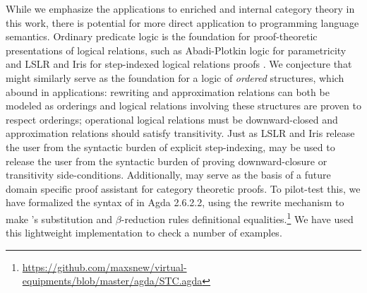 \documentclass{llncs}
\begin{document}

While we emphasize the applications to enriched and internal category
theory in this work, there is potential for more direct application to
programming language semantics.
%
Ordinary predicate logic is the foundation for proof-theoretic presentations of
logical relations, such as Abadi-Plotkin logic for parametricity and
LSLR and Iris for step-indexed logical relations proofs
\cite{abadi-plotkin,lslr,iris}.
%
We conjecture that \vett{} might similarly serve as the foundation for
a logic of \emph{ordered} structures, which abound in applications:
rewriting and approximation relations can both be modeled as orderings
and logical relations involving these structures are proven to respect
orderings; operational logical relations must be downward-closed and
approximation relations should satisfy transitivity.
%
Just as LSLR and Iris release the user from the syntactic burden of
explicit step-indexing, \vett{} may be used to release the user from
the syntactic burden of proving downward-closure or transitivity
side-conditions.
%
Additionally, \vett{} may serve as the basis of a future domain specific
proof assistant for category theoretic proofs.  To pilot-test this, we
have formalized the syntax of \vett{} in Agda 2.6.2.2, using the rewrite
mechanism to make \vett's substitution and $\beta$-reduction rules
definitional
equalities.\footnote{\url{https://github.com/maxsnew/virtual-equipments/blob/master/agda/STC.agda}}
We have used this lightweight implementation to check a number of
examples.  
\end{document}
